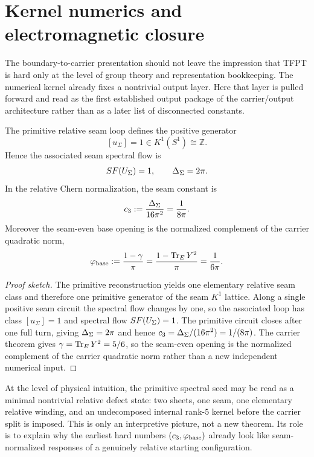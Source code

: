 
\section{Kernel numerics and electromagnetic closure}

The boundary-to-carrier presentation should not leave the impression that TFPT is hard only at the level of group theory and representation bookkeeping. The numerical kernel already fixes a nontrivial output layer. Here that layer is pulled forward and read as the first established output package of the carrier/output architecture rather than as a later list of disconnected constants.

\begin{theorem}
\label{thm:primitive-seam-generator}
The primitive relative seam loop defines the positive generator
\[
[u_\Sigma]=1\in K^1(S^1)\cong \mathbb Z.
\]
Hence the associated seam spectral flow is
\[
SF(U_\Sigma)=1,
\qquad
\Delta_\Sigma=2\pi.
\]
In the relative Chern normalization, the seam constant is
\[
c_3:=\frac{\Delta_\Sigma}{16\pi^2}=\frac{1}{8\pi}.
\]
Moreover the seam-even base opening is the normalized complement of the carrier quadratic norm,
\[
\varphi_{\mathrm{base}}
:=
\frac{1-\gamma}{\pi}
=
\frac{1-\operatorname{Tr}_EY^2}{\pi}
=
\frac{1}{6\pi}.
\]
\end{theorem}

\begin{proof}[Proof sketch]
The primitive reconstruction yields one elementary relative seam class and therefore one primitive
generator of the seam $K^1$ lattice. Along a single positive seam circuit the spectral flow changes
by one, so the associated loop has class $[u_\Sigma]=1$ and spectral flow $SF(U_\Sigma)=1$. The
primitive circuit closes after one full turn, giving $\Delta_\Sigma=2\pi$ and hence
$c_3=\Delta_\Sigma/(16\pi^2)=1/(8\pi)$. The carrier theorem gives
$\gamma=\operatorname{Tr}_EY^2=5/6$, so the seam-even opening is the normalized complement of the carrier
quadratic norm rather than a new independent numerical input.
\end{proof}

\begin{remark}
At the level of physical intuition, the primitive spectral seed may be read as a minimal nontrivial relative defect state: two sheets, one seam, one elementary relative winding, and an undecomposed internal rank-$5$ kernel before the carrier split is imposed. This is only an interpretive picture, not a new theorem. Its role is to explain why the earliest hard numbers $(c_3,\varphi_{\mathrm{base}})$ already look like seam-normalized responses of a genuinely relative starting configuration.
\end{remark}

